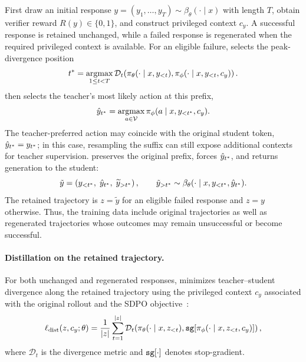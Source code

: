 First draw an initial response $y=(y_1,\ldots,y_T)\sim\beta_{\theta}(\cdot\mid x)$ with length $T$, obtain verifier reward $R(y)\in\{0,1\}$, and construct privileged context $c_y$. A successful response is retained unchanged, while a failed response is regenerated when the required privileged context is available. For an eligible failure, \method{} selects the peak-divergence position
\begin{equation}
t^{*}
=
\operatorname*{argmax}_{1\leq t<T}
\mathcal D_t\!\left(
\pi_{\theta}(\cdot\mid x,y_{<t}),
\pi_{\phi}(\cdot\mid x,y_{<t},c_y)
\right).
\label{eq:repo-branch-position}
\end{equation}
\method{} then selects the teacher's most likely action at this prefix,
\begin{equation}
\hat y_{t^{*}}
=
\operatorname*{argmax}_{a\in\mathcal{V}}
\pi_{\phi}(a\mid x,y_{<t^{*}},c_y).
\label{eq:repo-branch-action}
\end{equation}
The teacher-preferred action may coincide with the original student token, $\hat y_{t^{*}}=y_{t^{*}}$; in this case, resampling the suffix can still expose additional contexts for teacher supervision. \method{} preserves the original prefix, forces $\hat y_{t^{*}}$, and returns generation to the student:
\begin{equation}
\tilde y
=
\left(y_{<t^{*}}, \; \hat y_{t^{*}}, \; \widetilde y_{>t^{*}}\right),
\qquad
\tilde y_{>t^{*}}
\sim
\beta_{\theta}(\cdot\mid x,y_{<t^{*}},\hat y_{t^{*}}).
\label{eq:repo-conditional-law}
\end{equation}
The retained trajectory is $z=\tilde y$ for an eligible failed response and $z=y$ otherwise. Thus, the training data include original trajectories as well as regenerated trajectories whose outcomes may remain unsuccessful or become successful.


\vspace{-0.1cm}\paragraph{Distillation on the retained trajectory.}
For both unchanged and regenerated responses, \method{} minimizes teacher--student divergence along the retained trajectory using the privileged context $c_y$ associated with the original rollout and the SDPO objective~\citep{hubotter2026sdpo}:
\begin{equation}
\ell_{\mathrm{dist}}(z,c_y;\theta)
=
\frac{1}{|z|}
\sum_{t=1}^{|z|}
\mathcal D_t\!\left(
\pi_\theta(\cdot\mid x,z_{<t}),
{\tt sg}\!\left[
\pi_{\phi}(\cdot\mid x,z_{<t},c_y)
\right]
\right),
\label{eq:repo-per-trace-loss}
\end{equation}
where $\mathcal D_t$ is the divergence metric and ${\tt sg}[\cdot]$ denotes stop-gradient.



